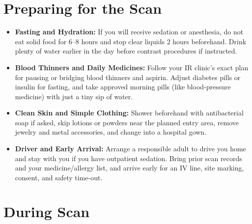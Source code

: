 \section{Preparing for the Scan}

\begin{itemize}
    \item \textbf{Fasting and Hydration:} If you will receive sedation or anesthesia, do not eat solid food for 6--8 hours and stop clear liquids 2 hours beforehand. Drink plenty of water earlier in the day before contrast procedures if instructed.
    \item \textbf{Blood Thinners and Daily Medicines:} Follow your IR clinic's exact plan for pausing or bridging blood thinners and aspirin. Adjust diabetes pills or insulin for fasting, and take approved morning pills (like blood-pressure medicine) with just a tiny sip of water.
    \item \textbf{Clean Skin and Simple Clothing:} Shower beforehand with antibacterial soap if asked, skip lotions or powders near the planned entry area, remove jewelry and metal accessories, and change into a hospital gown.
    \item \textbf{Driver and Early Arrival:} Arrange a responsible adult to drive you home and stay with you if you have outpatient sedation. Bring prior scan records and your medicine/allergy list, and arrive early for an IV line, site marking, consent, and safety time-out.
\end{itemize}

\section{During Scan}


